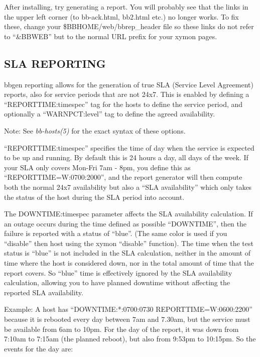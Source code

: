   After installing, try generating a report. You will probably see
  that the links in the upper left corner (to bb-ack.html, bb2.html
  etc.) no longer works. To fix these, change your
  \$BBHOME/web/bbrep\_header file so these links do not refer to
  ``\&BBWEB'' but to the normal URL prefix for your xymon pages. 



 
\subsection{SLA REPORTING}
 bbgen reporting allows for the generation of true SLA (Service Level
 Agreement) reports, also for service periods that are not 24x7. This
 is enabled by defining a ``REPORTTIME:timespec'' tag for the hosts to
 define the service period, and optionally a ``WARNPCT:level'' tag to
 define the agreed availability. 


  Note: See \emph{bb-hosts(5)}
 for the exact syntax of these options. 


  ``REPORTTIME:timespec'' specifies the time of day when the service
  is expected to be up and running. By default this is 24 hours a day,
  all days of the week. If your SLA only covers Mon-Fri 7am - 8pm, you
  define this as ``REPORTTIME=W:0700:2000'', and the report generator
  will then compute both the normal 24x7 availability but also a ``SLA
  availability'' which only takes the status of the host during the
  SLA period into account. 



  The DOWNTIME:timespec parameter affects the SLA availability
  calculation. If an outage occurs during the time defined as possible
  ``DOWNTIME'', then the failure is reported with a status of
  ``blue''. (The same color is used if you ``disable'' then host using
  the xymon ``disable'' function). The time when the test status is
  ``blue'' is not included in the SLA calculation, neither in the
  amount of time where the host is considered down, nor in the total
  amount of time that the report covers. So ``blue'' time is
  effectively ignored by the SLA availability calculation, allowing
  you to have planned downtime without affecting the reported SLA
  availability. 



  Example: A host has ``DOWNTIME:*:0700:0730 REPORTTIME=W:0600:2200''
  because it is rebooted every day between 7am and 7.30am, but the
  service must be available from 6am to 10pm. For the day of the
  report, it was down from 7:10am to 7:15am (the planned reboot), but
  also from 9:53pm to 10:15pm. So the events for the day are: 



